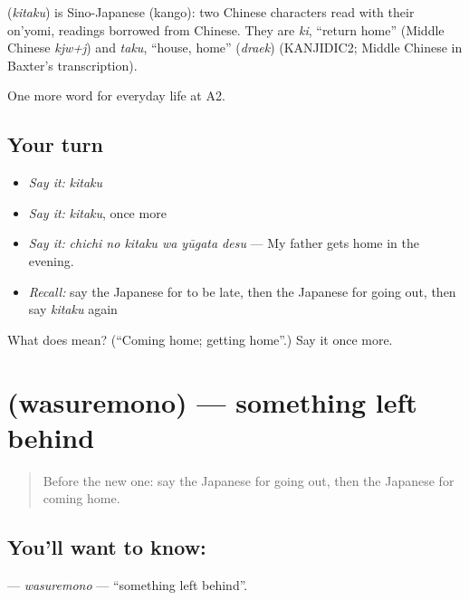 \begin{cousinweb}
\textbf{} (\emph{kitaku}) is Sino-Japanese (kango): two Chinese characters read with their on'yomi, readings borrowed from Chinese. They are \emph{ki}, \textquotedblleft{}return home\textquotedblright{} (Middle Chinese \emph{kjw+j}) and \emph{taku}, \textquotedblleft{}house, home\textquotedblright{} (\emph{draek}) (KANJIDIC2; Middle Chinese in Baxter's transcription).
\end{cousinweb}

\begin{grammarlens}[title={What you've built}]
One more word for everyday life at A2.
\end{grammarlens}

\subsection*{Your turn}
\begin{itemize}
\raggedright
  \item \emph{Say it:} \emph{kitaku}
  \item \emph{Say it:} \emph{kitaku}, once more
  \item \emph{Say it:} \emph{chichi no kitaku wa yūgata desu} — My father gets home in the evening.
  \item \emph{Recall:} say the Japanese for to be late, then the Japanese for going out, then say \emph{kitaku} again
\end{itemize}

\begin{tcolorbox}[breakable,colback=teal!4,colframe=teal!35!black,title={Before you move on}]
What does  mean? (\textquotedblleft{}Coming home; getting home\textquotedblright{}.) Say it once more.
\end{tcolorbox}
\section[\texorpdfstring{\ja{わすれもの} (wasuremono)}{わすれもの (wasuremono)}]{ (wasuremono) — something left behind}

\label{lesson:JA-C153-wasuremono}



\begin{quote}
Before the new one: say the Japanese for going out, then the Japanese for coming home.
\end{quote}

\subsection*{You'll want to know: }
\textbf{} — \emph{wasuremono} — \textquotedblleft{}something left behind\textquotedblright{}.

